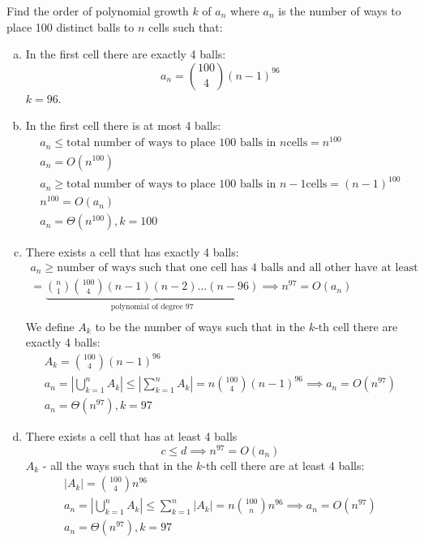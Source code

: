\documentclass[00_complete]{subfiles}
\begin{document}
\begin{example}
    Find the order of polynomial growth $k$ of $a_n$ where $a_n$ is the number of
    ways to place 100 distinct balls to $n$ cells such that:
    \begin{enumerate}[a.]
        \item In the first cell there are exactly 4 balls:
        $$a_n = \binom{100}{4}(n-1)^{96}$$
        $k=96$.
        \item In the first cell there is at most 4 balls:
        \begin{gather*}
            a_n \leq \text{total number of ways to place $100$ balls in $n$
            cells} = n^{100} \\
            a_n = O(n^{100}) \tag{I} \\
            a_n \geq \text{total number of ways to place $100$ balls in $n-1$
            cells} = (n-1)^{100} \\
            n^{100} = O(a_n) \tag{II} \\
            a_n=\Theta(n^{100}), k=100
        \end{gather*}
        \item There exists a cell that has exactly 4 balls:
        \begin{gather*}
        a_n \geq \text{number of ways such that one cell has 4 balls and all other
        have at least one} \\
        =\underbrace{\binom{n}{1}\binom{100}{4}(n-1)(n-2)\dots(n-96)}_{\text{polynomial
        of degree 97}} \implies n^{97} = O(a_n) \tag{I} \\
        \end{gather*}
        We define $A_k$ to be the number of ways such that in the $k$-th cell
        there are exactly 4 balls:
        \begin{gather*}
            A_k=\binom{100}{4}(n-1)^{96} \\
            a_n = \left|\bigcup_{k=1}^{n} A_k \right| \leq
            \left|\sum_{k=1}^{n}A_k\right| = n\binom{100}{4}(n-1)^{96} \implies
            a_n =O(n^{97}) \\
            a_n =\Theta(n^{97}), k=97
        \end{gather*}
        \item There exists a cell that has at least 4 balls
        $$c \leq d \implies n^{97} = O(a_n)$$
        $A_k$ - all the ways such that in the $k$-th cell there are at least 4
        balls:
        \begin{gather*}
            |A_k|=\binom{100}{4}n^{96} \\
            a_n=\left|\bigcup_{k=1}^nA_k\right|\leq\sum_{k=1}^{n}|A_k|
            = n\binom{100}{n}n^{96} \implies a_n = O(n^{97}) \\
            a_n = \Theta(n^{97}), k=97
        \end{gather*}
    \end{enumerate}
\end{example}
\end{document}
